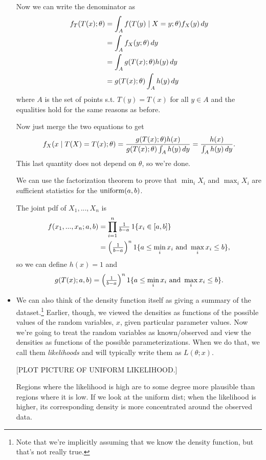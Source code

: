 \begin{itemize}[leftmargin=0pt]
  Now we can write the denominator as
  \begin{align*}
    f_T(T(x); \theta)
    &= \int_A f(T(y) \mid X = y; \theta) f_X(y) \,dy \\
    &= \int_A f_X(y; \theta) \,dy \\
    &= \int_A g(T(x); \theta) h(y) \,dy \\
    &= g(T(x); \theta) \int_A h(y) \,dy
  \end{align*}
  where $A$ is the set of points s.t. $T(y) = T(x)$ for all $y \in A$
  and the equalities hold for the same reasons as before.

  Now just merge the two equations to get
  \begin{equation*}
    f_X(x \mid T(X) = T(x); \theta)
    = \frac{g(T(x); \theta) h(x)}{g(T(x); \theta) \int_A h(y) \,dy}
    = \frac{h(x)}{\int_A h(y) \,dy}.
  \end{equation*}
  This last quantity does not depend on $\theta$, so we're done.

  We can use the factorization theorem to prove that $\min_i X_i$ and
  $\max_i X_i$ are sufficient statistics for the $\operatorname{uniform}(a,b)$.
  \begin{ex}
    The joint pdf of $X_1,...,X_n$ is
    \begin{align*}
      f(x_1,...,x_n; a, b)
      &= \prod_{i=1}^n \tfrac{1}{b-a} \operatorname{1}\{x_i \in [a,b]\} \\
      &= \Big(\tfrac{1}{b-a}\Big)^n \operatorname{1}\{a \leq \min_i x_i
         \text{ and } \max_i x_i \leq b\},
    \end{align*}
    so we can define $h(x) = 1$ and
    \begin{equation*}
      g(T(x); a, b) = \Big(\tfrac{1}{b-a}\Big)^n
        \operatorname{1}\{a \leq \min_i x_i \text{ and } \max_i x_i \leq b\}.
    \end{equation*}
  \end{ex}

\item We can also think of the density function itself as giving a
  summary of the dataset.\footnote{Note that we're implicitly assuming
    that we know the density function, but that's not really true.}
  Earlier, though, we viewed the densities as functions of the
  possible values of the random variables, $x$, given particular
  parameter values.  Now we're going to treat the random variables as
  known/observed and view the densities as functions of the possible
  parameterizations.  When we do that, we call them \emph{likelihoods}
  and will typically write them as $L(\theta; x)$.

  [PLOT PICTURE OF UNIFORM LIKELIHOOD.]

  Regions where the likelihood is high are to some degree more
  plausible than regions where it is low.  If we look at the uniform
  dist; when the likelihood is higher, its corresponding density is
  more concentrated around the observed data.

\end{itemize}

